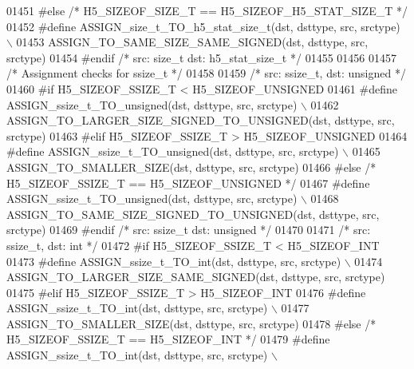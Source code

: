 \begin{DoxyCode}
01451 \textcolor{preprocessor}{#else }\textcolor{comment}{/* H5\_SIZEOF\_SIZE\_T == H5\_SIZEOF\_H5\_STAT\_SIZE\_T */}\textcolor{preprocessor}{}
01452 \textcolor{preprocessor}{    #define ASSIGN\_size\_t\_TO\_h5\_stat\_size\_t(dst, dsttype, src, srctype) \(\backslash\)}
01453 \textcolor{preprocessor}{        ASSIGN\_TO\_SAME\_SIZE\_SAME\_SIGNED(dst, dsttype, src, srctype)}
01454 \textcolor{preprocessor}{#endif }\textcolor{comment}{/* src: size\_t dst: h5\_stat\_size\_t */}\textcolor{preprocessor}{}
01455 
01456 
01457 \textcolor{comment}{/* Assignment checks for ssize\_t */}
01458 
01459 \textcolor{comment}{/* src: ssize\_t, dst: unsigned */}
01460 \textcolor{preprocessor}{#if H5\_SIZEOF\_SSIZE\_T < H5\_SIZEOF\_UNSIGNED}
01461 \textcolor{preprocessor}{    #define ASSIGN\_ssize\_t\_TO\_unsigned(dst, dsttype, src, srctype) \(\backslash\)}
01462 \textcolor{preprocessor}{        ASSIGN\_TO\_LARGER\_SIZE\_SIGNED\_TO\_UNSIGNED(dst, dsttype, src, srctype)}
01463 \textcolor{preprocessor}{#elif H5\_SIZEOF\_SSIZE\_T > H5\_SIZEOF\_UNSIGNED}
01464 \textcolor{preprocessor}{    #define ASSIGN\_ssize\_t\_TO\_unsigned(dst, dsttype, src, srctype) \(\backslash\)}
01465 \textcolor{preprocessor}{        ASSIGN\_TO\_SMALLER\_SIZE(dst, dsttype, src, srctype)}
01466 \textcolor{preprocessor}{#else }\textcolor{comment}{/* H5\_SIZEOF\_SSIZE\_T == H5\_SIZEOF\_UNSIGNED */}\textcolor{preprocessor}{}
01467 \textcolor{preprocessor}{    #define ASSIGN\_ssize\_t\_TO\_unsigned(dst, dsttype, src, srctype) \(\backslash\)}
01468 \textcolor{preprocessor}{        ASSIGN\_TO\_SAME\_SIZE\_SIGNED\_TO\_UNSIGNED(dst, dsttype, src, srctype)}
01469 \textcolor{preprocessor}{#endif }\textcolor{comment}{/* src: ssize\_t dst: unsigned */}\textcolor{preprocessor}{}
01470 
01471 \textcolor{comment}{/* src: ssize\_t, dst: int */}
01472 \textcolor{preprocessor}{#if H5\_SIZEOF\_SSIZE\_T < H5\_SIZEOF\_INT}
01473 \textcolor{preprocessor}{    #define ASSIGN\_ssize\_t\_TO\_int(dst, dsttype, src, srctype) \(\backslash\)}
01474 \textcolor{preprocessor}{        ASSIGN\_TO\_LARGER\_SIZE\_SAME\_SIGNED(dst, dsttype, src, srctype)}
01475 \textcolor{preprocessor}{#elif H5\_SIZEOF\_SSIZE\_T > H5\_SIZEOF\_INT}
01476 \textcolor{preprocessor}{    #define ASSIGN\_ssize\_t\_TO\_int(dst, dsttype, src, srctype) \(\backslash\)}
01477 \textcolor{preprocessor}{        ASSIGN\_TO\_SMALLER\_SIZE(dst, dsttype, src, srctype)}
01478 \textcolor{preprocessor}{#else }\textcolor{comment}{/* H5\_SIZEOF\_SSIZE\_T == H5\_SIZEOF\_INT */}\textcolor{preprocessor}{}
01479 \textcolor{preprocessor}{    #define ASSIGN\_ssize\_t\_TO\_int(dst, dsttype, src, srctype) \(\backslash\)}

\end{DoxyCode}
